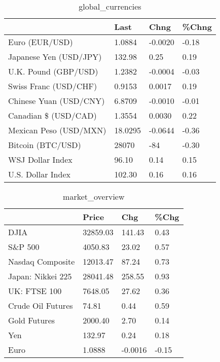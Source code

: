\documentclass{article}%
\begin{document}
%


\begin{table}[htbp]%
\caption{global\_currencies}%
\centering%
\begin{adjustbox}{width=1\textwidth}%
\begin{tabular}{llll}
\toprule
                       &    Last &    Chng & \%Chng \\
\midrule
        Euro (EUR/USD) &  1.0884 & -0.0020 & -0.18 \\
Japanese Yen (USD/JPY) &  132.98 &    0.25 &  0.19 \\
  U.K. Pound (GBP/USD) &  1.2382 & -0.0004 & -0.03 \\
 Swiss Franc (USD/CHF) &  0.9153 &  0.0017 &  0.19 \\
Chinese Yuan (USD/CNY) &  6.8709 & -0.0010 & -0.01 \\
  Canadian \$ (USD/CAD) &  1.3554 &  0.0030 &  0.22 \\
Mexican Peso (USD/MXN) & 18.0295 & -0.0644 & -0.36 \\
     Bitcoin (BTC/USD) &   28070 &     -84 & -0.30 \\
      WSJ Dollar Index &   96.10 &    0.14 &  0.15 \\
     U.S. Dollar Index &  102.30 &    0.16 &  0.16 \\
\bottomrule
\end{tabular}
%
\end{adjustbox}%
\end{table}

%


\begin{table}[htbp]%
\caption{market\_overview}%
\centering%
\begin{adjustbox}{width=1\textwidth}%
\begin{tabular}{llll}
\toprule
                  &    Price &     Chg &  \%Chg \\
\midrule
             DJIA & 32859.03 &  141.43 &  0.43 \\
          S\&P 500 &  4050.83 &   23.02 &  0.57 \\
 Nasdaq Composite & 12013.47 &   87.24 &  0.73 \\
Japan: Nikkei 225 & 28041.48 &  258.55 &  0.93 \\
     UK: FTSE 100 &  7648.05 &   27.62 &  0.36 \\
Crude Oil Futures &    74.81 &    0.44 &  0.59 \\
     Gold Futures &  2000.40 &    2.70 &  0.14 \\
              Yen &   132.97 &    0.24 &  0.18 \\
             Euro &   1.0888 & -0.0016 & -0.15 \\
\bottomrule
\end{tabular}
%
\end{adjustbox}%
\end{table}

%
\end{document}
